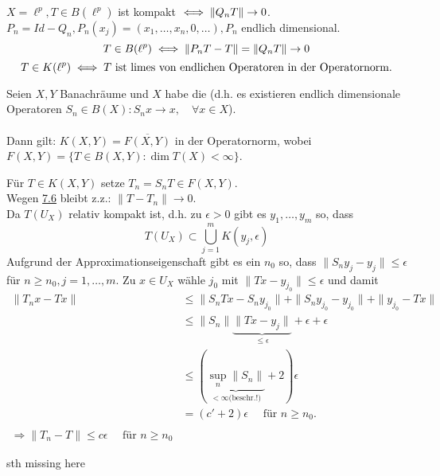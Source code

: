 \begin{beispiel*}
	$X = \ell^{p}, T \in B(\ell^{p})$ ist kompakt $\iff \| Q_{n} T \| \rightarrow 0$. \\
	$P_{n} = Id - Q_{n}, P_{n}(x_{j}) = (x_{1}, \dotsc, x_{n}, 0, \dotsc), P_{n}$ endlich dimensional. \\
	\[ T \in B(\ell^{p}) \iff \| P_{n} T - T \| = \| Q_{n} T \| \rightarrow 0 \]
	\[ T \in K(\ell^{p}) \iff T \text{ ist limes von endlichen Operatoren in der Operatornorm.} \]
\end{beispiel*}

\begin{satz} \label{satz:7.7}
	Seien $X, Y$ Banachräume und $X$ habe die  (d.h. es existieren endlich dimensionale Operatoren $S_{n} \in B(X): S_{n} x \rightarrow x, \quad \forall x \in X$). \\ \\
	Dann gilt: $K(X, Y) = \overline{F(X, Y)}$ in der Operatornorm, wobei $F(X, Y) = \{ T \in B(X, Y): \dim T(X) < \infty \}$.
\end{satz}
\begin{beweis}
	Für $T \in K(X, Y)$ setze $T_{n} = S_{n} T \in F(X, Y)$. \\
	Wegen \hyperref[kor:7.6]{7.6} bleibt z.z.: $\| T - T_{n} \| \rightarrow 0$. \\
	Da $T(U_{X})$ relativ kompakt ist, d.h. zu $\epsilon > 0$ gibt es $y_{1}, \dotsc, y_{m}$ so, dass
	\[ T(U_{X}) \subset \bigcup_{j = 1}^{m} K(y_{j}, \epsilon) \]
	Aufgrund der Approximationseigenschaft gibt es ein $n_{0}$ so, dass  $\| S_{n} y_{j} - y_{j} \| \leq \epsilon$ für $n \geq n_{0}, j = 1, \dotsc, m$. Zu $x \in U_{X}$ wähle $j_{0}$ mit $\| Tx - y_{j_{0}} \| \leq \epsilon$ und damit
	\begin{align*}
		\| T_{n} x - T x \| & \leq \| S_{n} T x - S_{n} y_{j_{0}} \| + \| S_{n} y_{j_{0}} - y_{j_{0}} \| + \| y_{j_{0}}- Tx \| \\
			& \leq \| S_{n} \| \underbrace{\| T x - y_{j} \|}_{\leq \epsilon} + \epsilon + \epsilon \\
			& \leq \left( \underbrace{\sup_{n} \| S_{n} \|}_{< \infty \text{(beschr.!)}} + 2 \right) \epsilon \\
			& = \left( c' + 2 \right) \epsilon \quad \text{ für } n \geq n_{0}. \\ \\
			\Rightarrow \| T_{n} - T \| \leq c \epsilon \quad \text{ für } n \geq n_{0}
	\end{align*}
	\[  \]
\end{beweis}

sth missing here %

\newpage






























	